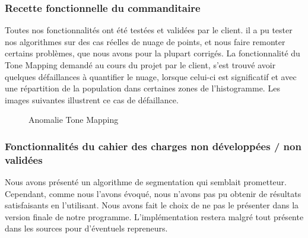 \documentclass[12pt,titlepage,french]{article}
\begin{document}
\subsubsection {Recette fonctionnelle du commanditaire}

Toutes nos fonctionnalités ont été testées et validées par le client. il a pu tester nos algorithmes sur des cas réelles de nuage de points, et nous faire remonter certains problèmes, que nous avons pour la plupart corrigés.
La fonctionnalité du Tone Mapping demandé au cours du projet par le client, s'est trouvé avoir quelques défaillances à quantifier le nuage, lorsque celui-ci est significatif et avec une répartition de la population dans certaines zones de l'histogramme. Les images suivantes illustrent ce cas de défaillance.
\begin{figure}[H]
    \caption{\label{} Anomalie Tone Mapping}
\end{figure}

\subsubsection {Fonctionnalités du cahier des charges non développées / non validées}

Nous avons présenté un algorithme de segmentation qui semblait prometteur. Cependant, comme nous l'avons évoqué, nous n'avons pas pu obtenir de résultats satisfaisants en l'utilisant. Nous avons fait le choix de ne pas le présenter dans la version finale de notre programme. L'implémentation restera malgré tout présente dans les sources pour d'éventuels repreneurs. \newline
\end{document}
